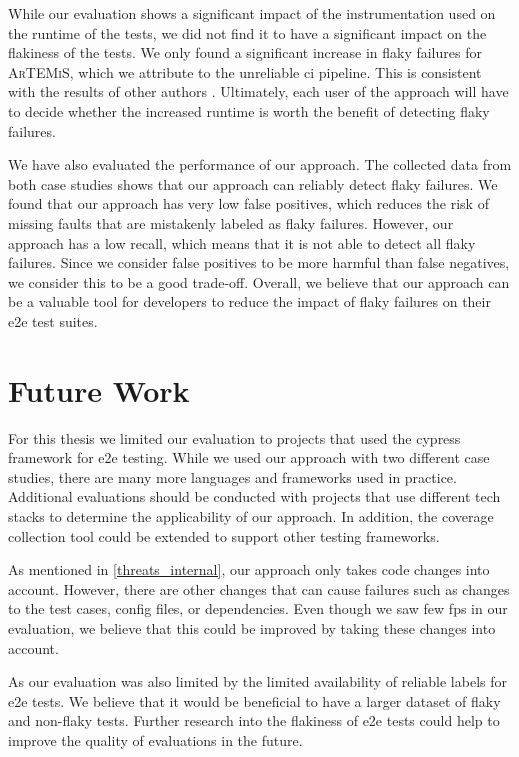 While our evaluation shows a significant impact of the instrumentation used on the runtime of the tests, we did not find it to have a significant impact on the flakiness of the tests.
We only found a significant increase in flaky failures for \textsc{ArTEMiS}, which we attribute to the unreliable \ac{ci} pipeline.
This is consistent with the results of other authors \autocite{rasheed_effect_2023}.
Ultimately, each user of the approach will have to decide whether the increased runtime is worth the benefit of detecting flaky failures.

We have also evaluated the performance of our approach.
The collected data from both case studies shows that our approach can reliably detect flaky failures.
We found that our approach has very low false positives, which reduces the risk of missing faults that are mistakenly labeled as flaky failures.
However, our approach has a low recall, which means that it is not able to detect all flaky failures.
Since we consider false positives to be more harmful than false negatives, we consider this to be a good trade-off.
Overall, we believe that our approach can be a valuable tool for developers to reduce the impact of flaky failures on their \ac{e2e} test suites.

\section{Future Work}
For this thesis we limited our evaluation to projects that used the cypress framework for \ac{e2e} testing.
While we used our approach with two different case studies, there are many more languages and frameworks used in practice.
Additional evaluations should be conducted with projects that use different tech stacks to determine the applicability of our approach.
In addition, the coverage collection tool could be extended to support other testing frameworks.

As mentioned in \cref{threats_internal}, our approach only takes code changes into account.
However, there are other changes that can cause failures such as changes to the test cases, config files, or dependencies.
Even though we saw few \aclp{fp} in our evaluation, we believe that this could be improved by taking these changes into account.

As our evaluation was also limited by the limited availability of reliable labels for \ac{e2e} tests.
We believe that it would be beneficial to have a larger dataset of flaky and non-flaky tests.
Further research into the flakiness of \ac{e2e} tests could help to improve the quality of evaluations in the future.

